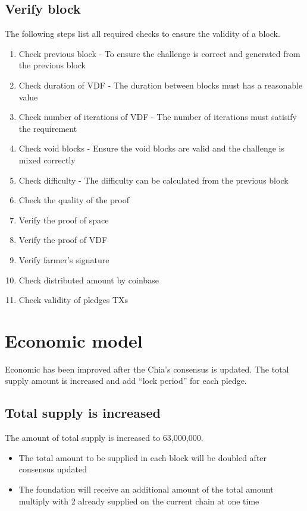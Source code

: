 \subsection{Verify block}
\begin{flushleft}
    The following steps list all required checks to ensure the validity of a block.
\end{flushleft}
\begin{enumerate}
    \item Check previous block - To ensure the challenge is correct and generated from the previous block
    \item Check duration of VDF - The duration between blocks must has a reasonable value
    \item Check number of iterations of VDF - The number of iterations must satisify the requirement
    \item Check void blocks - Ensure the void blocks are valid and the challenge is mixed correctly
    \item Check difficulty - The difficulty can be calculated from the previous block
    \item Check the quality of the proof
    \item Verify the proof of space
    \item Verify the proof of VDF
    \item Verify farmer's signature
    \item Check distributed amount by coinbase
    \item Check validity of pledges TXs
\end{enumerate}
\section{Economic model}
\begin{flushleft}
    Economic has been improved after the Chia's consensus is updated. The total supply amount is increased and add ``lock period'' for each pledge.
\end{flushleft}
\subsection{Total supply is increased}
\begin{flushleft}
    The amount of total supply is increased to 63,000,000.
\end{flushleft}
\begin{itemize}
    \item The total amount to be supplied in each block will be doubled after consensus updated
    \item The foundation will receive an additional amount of the total amount multiply with 2 already supplied on the current chain at one time
\end{itemize}

